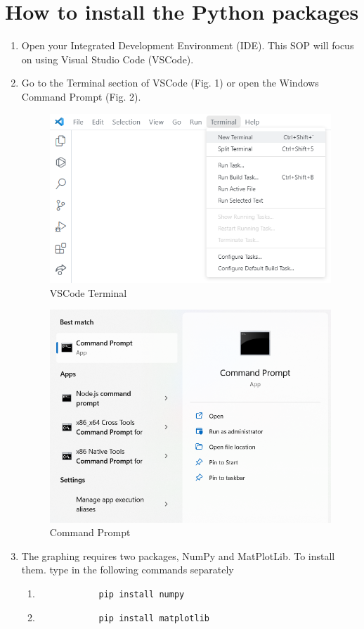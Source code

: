 \documentclass[
11pt, %
a4paper, %
oneside, %
headinclude,footinclude, %
BCOR5mm, %
]{scrartcl}
\begin{document}
\section{How to install the Python packages}
\begin{enumerate}
	\item Open your Integrated Development Environment (IDE). This SOP will focus on using Visual Studio Code (VSCode).
	\item Go to the Terminal section of VSCode (Fig. 1) or open the Windows Command Prompt (Fig. 2).
	\begin{figure}[H]
		\centering %
		\includegraphics[width=0.4\columnwidth]{Figures/Figure1.png} 
		\caption[VSCode Terminal]{VSCode Terminal} %
		\label{fig:gallery} 
	\end{figure}
	\begin{figure}[H]
		\centering %
		\includegraphics[width=0.4\columnwidth]{Figures/Figure2.png} 
		\caption[Command Prompt]{Command Prompt} %
		\label{fig:gallery} 
	\end{figure}
	\item The graphing requires two packages, NumPy and MatPlotLib. To install them. type in the following commands separately
	\begin{enumerate}
		\item[] \begin{verbatim}
			pip install numpy
		\end{verbatim}
		\item[] \begin{verbatim}
			pip install matplotlib
		\end{verbatim}
	\end{enumerate}
\end{enumerate}
\end{document}

